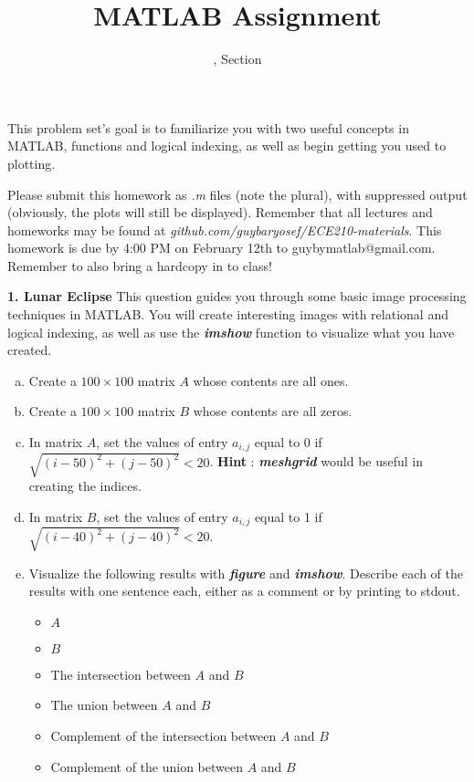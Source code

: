 \documentclass[11pt]{article}
\title{MATLAB Assignment \Homework}
\author{\Session, Section \Section}
\date{}
\makeatletter
\def\MyEmail{guybymatlab@gmail.com}
\def\DateOfSubmission{February 12th }
\makeatother
\begin{document}
\maketitle
This problem set's goal is to familiarize you with two useful concepts in MATLAB,
functions and logical indexing, as well as begin getting you used to plotting.

Please submit this homework as \textit{.m} files (note the plural), 
with suppressed output (obviously, the plots will still be displayed).
Remember that all lectures and homeworks may be found at 
\textit{github.com/guybaryosef/ECE210-materials}.
This homework is due by 4:00 PM on \DateOfSubmission to \MyEmail.
Remember to also bring a hardcopy in to class!

\noindent
\newline
\textbf{1. Lunar Eclipse} 
This question guides you through some basic image processing techniques in MATLAB. 
You will create interesting images with relational and logical indexing, 
as well as use the \textbf{\textit{imshow}} function to visualize what you have created.  
\begin{enumerate}[a.]

    \item Create a $100 \times 100$ matrix $A$ whose contents are all ones.
    
    \item Create a $100 \times 100$ matrix $B$ whose contents are all zeros.
    
    \item In matrix $A$, set the values of entry $a_{i,j}$ equal to 0 
    if $\sqrt{(i-50)^2 + (j-50)^2} < 20$. 
    \textbf{Hint} : \textbf{\textit{meshgrid}} would be useful in creating the indices.
    
    \item In matrix $B$, 
    set the values of entry $a_{i,j}$ equal to 1 if $\sqrt{(i-40)^2 + (j-40)^2} < 20$.
    
    \item Visualize the following results with \textbf{\textit{figure}} and \textbf{\textit{imshow}}. 
    Describe each of the results with one sentence each,
    either as a comment or by printing to stdout. 
    \begin{itemize}
        \item $A$
        \item $B$
        \item The intersection between $A$ and $B$
        \item The union between $A$ and $B$
        \item Complement of the intersection between $A$ and $B$
        \item Complement of the union between $A$ and $B$
    \end{itemize}

\end{enumerate}
\end{document}
